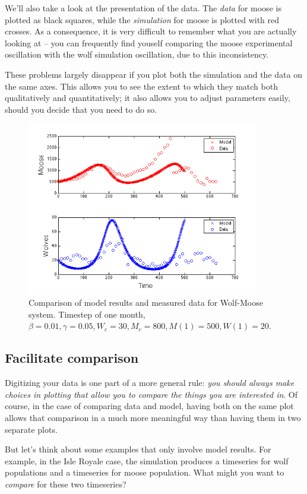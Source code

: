 We'll also take a look at the presentation of the data.  The {\it data} for moose is plotted as black squares, while the {\it simulation} for moose is plotted with red crosses.  As a consequence, it is very difficult to remember what you are actually looking at -- you can frequently find youself comparing the moose experimental oscillation with the wolf simulation oscillation, due to this inconsistency.

These problems largely disappear if you plot both the simulation and the data on the same axes.  This allows you to see the extent to which they match both qualitatively and quantitatively; it also allows you to adjust parameters easily, should you decide that you need to do so. 

\begin{figure}[h!]
\includegraphics[width=4in]{figs/ModelDataComparison}
\caption{Comparison of model results and measured data  for Wolf-Moose system. Timestep of one month,  $\beta = 0.01, \gamma = 0.05, W_c = 30, M_c=800, M(1) = 500, W(1) = 20$.}
\end{figure}


\subsection{Facilitate comparison}

Digitizing your data is one part of a more general rule:  {\it you should always make choices in plotting that allow you to compare the things you are interested in}.  Of course, in the case of comparing data and model, having both on the same plot allows that comparison in a much more meaningful way than having them in two separate plots.  

But let's think about some examples that only involve model results.  For example, in the Isle Royale case, the simulation produces a timeseries for wolf populations and a timeseries for moose population.  What might you want to {\em compare} for these two timeseries?  


